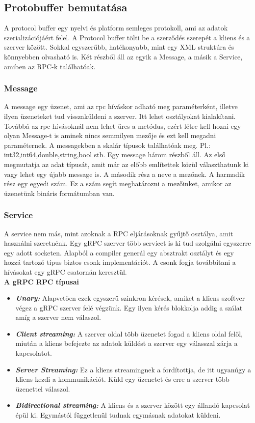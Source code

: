 \documentclass[
]{thesis-ekf}
\theoremstyle{definition}
\theoremstyle{remark}
\begin{document}
\subsection{Protobuffer bemutatása}
A protocol buffer egy nyelvi és platform semleges protokoll, ami az adatok szerializációjáért felel. A Protocol buffer tölti be a szerződés szerepét a kliens és a szerver között. Sokkal egyszerűbb, hatékonyabb, mint egy XML struktúra és könnyebben olvasható is. Két részből áll az egyik a Message, a másik a Service, amiben az RPC-k találhatóak. 
\subsubsection{Message}
A message egy üzenet, ami az rpc híváskor adható meg paraméterként, illetve ilyen üzeneteket tud visszaküldeni a szerver. Itt lehet osztályokat kialakítani. Továbbá az rpc hívásoknál nem lehet üres a metódus, ezért létre kell hozni egy olyan Message-t is aminek nincs semmilyen mezője és ezt kell megadni paraméternek. A messagekben a skalár típusok találhatóak meg. Pl.: int32,int64,double,string,bool stb. Egy message három részből áll. Az első megmutatja az adat típusát, amit már az előbb említettek közül választhatunk ki vagy lehet egy újabb message is. A második rész a neve a mezőnek. A harmadik rész egy egyedi szám. Ez a szám segít meghatározni a mezőinket, amikor az üzenetünk bináris formátumban van.
\subsubsection{Service}
A service nem más, mint azoknak a RPC eljárásoknak gyűjtő osztálya, amit használni szeretnénk. Egy gRPC szerver több servicet is ki tud szolgálni egyszerre egy adott socketen. Alapból a compiler generál egy absztrakt osztályt és egy hozzá tartozó típus biztos csonk implementációt. A csonk fogja továbbítani a hívásokat egy gRPC csatornán keresztül.\\\textbf{A gRPC RPC típusai}
\begin{itemize}[leftmargin=0pt]
	\item[] \textit{\textbf{Unary: }}Alapvetően ezek egyszerű szinkron kérések, amiket a kliens szoftver végez a gRPC szerver felé végzünk. Egy ilyen kérés blokkolja addig a szálat amíg a szerver nem válaszol. 
	\item[] \textit{\textbf{Client streaming:  }}A szerver oldal több üzenetet fogad a kliens oldal felől, miután a kliens befejezte az adatok küldést a szerver egy válasszal zárja a kapcsolatot.
	\item[] \textit{\textbf{Server Streaming: }}Ez a kliens streamingnek a fordítottja, de itt ugyanúgy a kliens kezdi a kommunikációt. Küld egy üzenetet és erre a szerver több üzenettel válaszol. 
	\item[] \textit{\textbf{Bidirectional streaming: }}A kliens és a szerver között egy állandó kapcsolat épül ki. Egymástól függetlenül tudnak egymásnak adatokat küldeni. 
\end{itemize}
\end{document}

